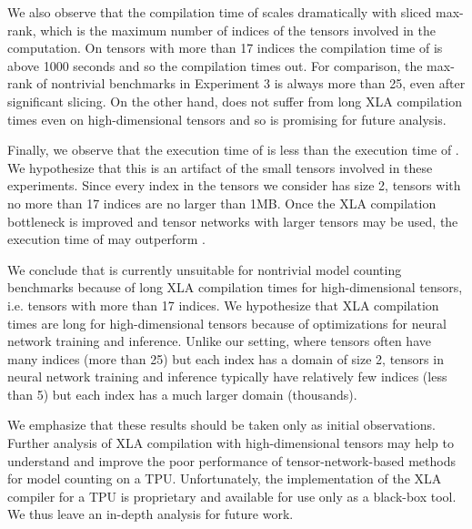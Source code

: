 We also observe that the compilation time of  scales dramatically with sliced max-rank, which is the maximum number of indices of the tensors involved in the computation.
On tensors with more than 17 indices the compilation time of  is above 1000 seconds and so the compilation times out.
For comparison, the max-rank of nontrivial benchmarks in Experiment 3 is always more than 25, even after significant slicing.
On the other hand,  does not suffer from long XLA compilation times even on high-dimensional tensors and so is promising for future analysis.

Finally, we observe that the execution time of  is less than the execution time of .
We hypothesize that this is an artifact of the small tensors involved in these experiments. Since every index in the tensors we consider has size 2, tensors with no more than 17 indices are no larger than 1MB.
Once the XLA compilation bottleneck is improved and tensor networks with larger tensors may be used, the execution time of  may outperform .

We conclude that  is currently unsuitable for nontrivial model counting benchmarks because of long XLA compilation times for high-dimensional tensors, i.e. tensors with more than 17 indices.
We hypothesize that XLA compilation times are long for high-dimensional tensors because of optimizations for neural network training and inference. 
Unlike our setting, where tensors often have many indices (more than 25) but each index has a domain of size 2, tensors in neural network training and inference typically have relatively few indices (less than 5) but each index has a much larger domain (thousands). %

We emphasize that these results should be taken only as initial observations.
Further analysis of XLA compilation with high-dimensional tensors may help to understand and improve the poor performance of tensor-network-based methods for model counting on a TPU.
Unfortunately, the implementation of the XLA compiler for a TPU is proprietary and available for use only as a black-box tool. 
We thus leave an in-depth analysis for future work.
